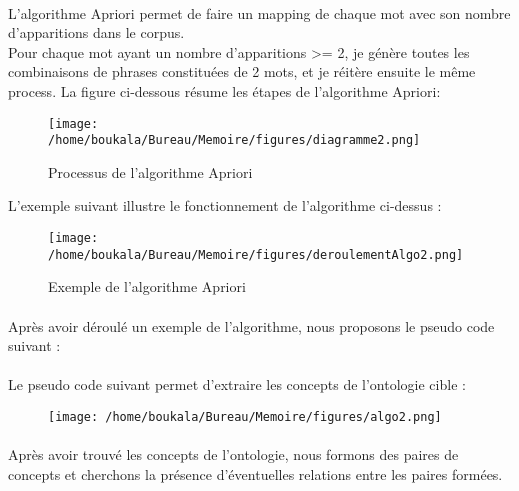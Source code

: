 \documentclass[12pt, a4paper, oneside]{book}
\begin{document}
\paragraph{}
L'algorithme Apriori permet de faire un mapping de chaque mot avec son nombre d'apparitions dans le corpus.\\
Pour chaque mot ayant un nombre d'apparitions >= 2, je génère toutes les combinaisons de phrases constituées de 2 mots, et je réitère ensuite le même process. La figure ci-dessous résume les étapes de l'algorithme Apriori:


\begin{figure}[h!]
\begin{center}
\texttt{[image: /home/boukala/Bureau/Memoire/figures/diagramme2.png]}
\caption{Processus de l'algorithme Apriori}
\end{center}
\end{figure}

L'exemple suivant illustre le fonctionnement de l'algorithme ci-dessus : 

\begin{figure}[h!]
\begin{center}
\texttt{[image: /home/boukala/Bureau/Memoire/figures/deroulementAlgo2.png]}
\caption{Exemple de l'algorithme Apriori}
\end{center}
\end{figure}





\paragraph{}
Après avoir déroulé un exemple de l'algorithme, nous proposons le pseudo code suivant :
\paragraph{} 
Le pseudo code suivant permet d'extraire les concepts de l'ontologie cible : 

\begin{figure}[h!]
\begin{center}
\texttt{[image: /home/boukala/Bureau/Memoire/figures/algo2.png]}
\end{center}
\end{figure}


\paragraph{}
Après avoir trouvé les concepts de l'ontologie, nous formons des paires de concepts et cherchons la présence d'éventuelles relations entre les paires formées.
\end{document}
